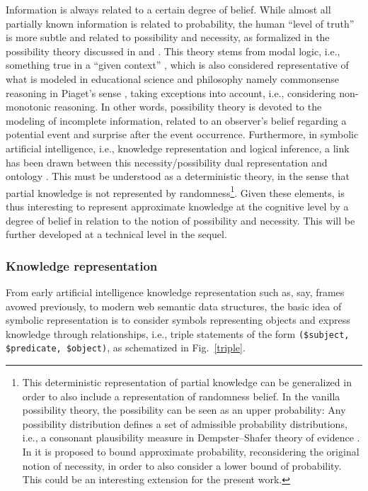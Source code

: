 \documentclass[sn-mathphys]{sn-jnl}
\begin{document}
Information is always related to a certain degree of belief. While almost all partially known information is related to probability, the human ``level of truth'' is more subtle and related to possibility and necessity, as formalized in the possibility theory discussed in \cite{denoeux_representations_2020} and \cite{denoeux_representations_2020-1}. This theory stems from modal logic, i.e., something true in a ``given context'' \cite{fischer_modal_2018}, which is also considered representative of what is modeled in educational science and philosophy \cite{rusawuk_possibility_2018} namely commonsense reasoning in Piaget's sense \cite{smith_development_1994}, taking exceptions into account, i.e., considering non-monotonic reasoning. In other words, possibility theory is devoted to the modeling of incomplete information, related to an observer's belief regarding a potential event and surprise after the event occurrence. Furthermore, in symbolic artificial intelligence, i.e., knowledge representation and logical inference, a link has been drawn between this necessity/possibility dual representation and ontology \cite{tettamanzi_possibilistic_2017}. This must be understood as a deterministic theory, in the sense that partial knowledge is not represented by randomness\footnote{This deterministic representation of partial knowledge can be generalized in order to also include a representation of randomness belief. In the vanilla possibility theory, the possibility can be seen as an upper probability: Any possibility distribution defines a set of admissible probability distributions, i.e., a consonant plausibility measure in Dempster–Shafer theory of evidence \cite{beynon_dempstershafer_2000}. In \cite{vallaeys_generaliser_2021,vieville_representation_2022} it is proposed to bound approximate probability, reconsidering the original notion of necessity, in order to also consider a lower bound of probability. This could be an interesting extension for the present work.}. Given these elements, is thus interesting to represent approximate knowledge at the cognitive level by a degree of belief in relation to the notion of possibility and necessity. This will be further developed at a technical level in the sequel.

\subsubsection{Knowledge representation}

From early artificial intelligence knowledge representation such as, say, frames avowed previously, to modern web semantic data structures, the basic idea of symbolic representation is to consider symbols representing objects and express knowledge through relationships, i.e., triple statements of the form {\tt (\$subject, \$predicate, \$object)}, as schematized in Fig.~\ref{triple}.
\end{document}
